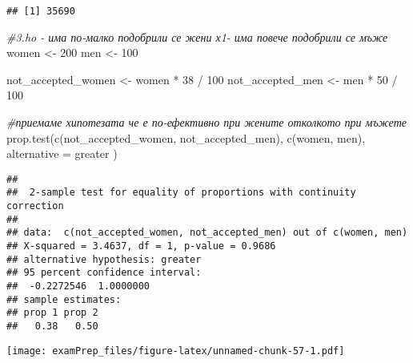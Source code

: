 \documentclass[
]{article}
\newenvironment{Shaded}{\begin{snugshade}}{\end{snugshade}}
\newcommand{\AttributeTok}[1]{\textcolor[rgb]{0.77,0.63,0.00}{#1}}
\newcommand{\CommentTok}[1]{\textcolor[rgb]{0.56,0.35,0.01}{\textit{#1}}}
\newcommand{\DecValTok}[1]{\textcolor[rgb]{0.00,0.00,0.81}{#1}}
\newcommand{\FunctionTok}[1]{\textcolor[rgb]{0.00,0.00,0.00}{#1}}
\newcommand{\NormalTok}[1]{#1}
\newcommand{\OtherTok}[1]{\textcolor[rgb]{0.56,0.35,0.01}{#1}}
\newcommand{\SpecialCharTok}[1]{\textcolor[rgb]{0.00,0.00,0.00}{#1}}
\newcommand{\StringTok}[1]{\textcolor[rgb]{0.31,0.60,0.02}{#1}}
\begin{document}
\begin{verbatim}
## [1] 35690
\end{verbatim}

\begin{Shaded}
\begin{Highlighting}[]
\CommentTok{\#3.ho {-} има по{-}малко подобрили се жени х1{-} има повече подобрили се мъже}
\NormalTok{women }\OtherTok{\textless{}{-}} \DecValTok{200}
\NormalTok{men }\OtherTok{\textless{}{-}} \DecValTok{100}

\NormalTok{not\_accepted\_women }\OtherTok{\textless{}{-}}\NormalTok{ women }\SpecialCharTok{*} \DecValTok{38} \SpecialCharTok{/} \DecValTok{100}
\NormalTok{not\_accepted\_men }\OtherTok{\textless{}{-}}\NormalTok{ men }\SpecialCharTok{*} \DecValTok{50} \SpecialCharTok{/} \DecValTok{100}

\CommentTok{\#приемаме хипотезата че е по{-}ефективно при жените отколкото при мъжете}
\FunctionTok{prop.test}\NormalTok{(}\FunctionTok{c}\NormalTok{(not\_accepted\_women, not\_accepted\_men), }\FunctionTok{c}\NormalTok{(women, men), }\AttributeTok{alternative =} \StringTok{\textquotesingle{}greater\textquotesingle{}}\NormalTok{ )}
\end{Highlighting}
\end{Shaded}

\begin{verbatim}
## 
##  2-sample test for equality of proportions with continuity correction
## 
## data:  c(not_accepted_women, not_accepted_men) out of c(women, men)
## X-squared = 3.4637, df = 1, p-value = 0.9686
## alternative hypothesis: greater
## 95 percent confidence interval:
##  -0.2272546  1.0000000
## sample estimates:
## prop 1 prop 2 
##   0.38   0.50
\end{verbatim}

\begin{Shaded}
\end{Shaded}

\texttt{[image: examPrep\_files/figure-latex/unnamed-chunk-57-1.pdf]}
\end{document}
